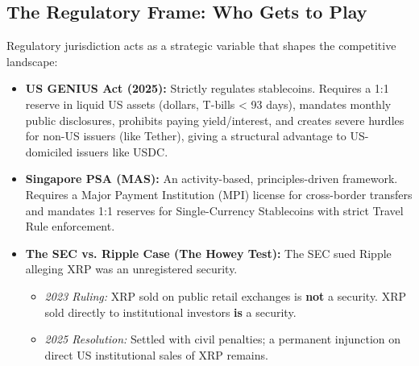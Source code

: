 \subsection{The Regulatory Frame: Who Gets to Play}
Regulatory jurisdiction acts as a strategic variable that shapes the
competitive landscape:
\begin{itemize}
    \item \textbf{US GENIUS Act (2025):} Strictly regulates stablecoins. Requires a 1:1 reserve
          in liquid US assets (dollars, T-bills < 93 days), mandates monthly public
          disclosures, prohibits paying yield/interest, and creates severe hurdles for
          non-US issuers (like Tether), giving a structural advantage to US-domiciled
          issuers like USDC.
    \item \textbf{Singapore PSA (MAS):} An activity-based, principles-driven framework. Requires
          a Major Payment Institution (MPI) license for cross-border transfers and
          mandates 1:1 reserves for Single-Currency Stablecoins with strict Travel Rule
          enforcement.
    \item \textbf{The SEC vs. Ripple Case (The Howey Test):} The SEC sued Ripple alleging XRP was
          an unregistered security.
          \begin{itemize}
              \item \textit{2023 Ruling:} XRP sold on public retail exchanges is \textbf{not} a security. XRP sold directly to institutional investors \textbf{is} a security.
              \item \textit{2025 Resolution:} Settled with civil penalties; a permanent injunction on direct US institutional sales of XRP remains.
          \end{itemize}
\end{itemize}
